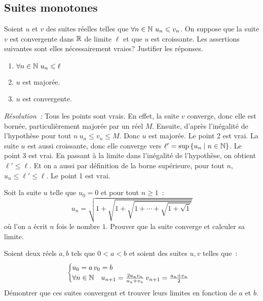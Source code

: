 \subsection{Suites monotones}
\begin{exercice}
    Soient \(u\) et \(v\) des suites réelles telles que \(\forall n 
    \in \mathbb{N} \ u_n \leqslant v_n\). On suppose que la suite \(v\) est 
    convergente dans \(\mathbb{R}\) de limite \(\ell\) et que \(u\) est 
    croissante. Les assertions suivantes sont elles nécessairement 
    vraies? Justifier les réponses.
    \begin{enumerate}
        \item \(\forall n \in \mathbb{N} \ u_n \leqslant \ell\)
        \item \(u\) est majorée.
        \item \(u\) est convergente.
    \end{enumerate}
\end{exercice}
\emph{Résolution~:} Tous les points sont vrais. En effet, la suite 
\(v\) converge, donc elle est bornée, particulièrement majorée par 
un réel \(M\). Ensuite, d'après l'inégalité de l'hypothèse pour 
tout \(n \ u_n \leqslant v_n \leqslant M\). Donc \(u\) est 
majorée. Le point 2 est vrai. La suite \(u\) est aussi croissante, 
donc elle converge vers \(\ell' = \sup\left\{u_n\mathrel{}\middle|\mathrel{}n\in \mathbb{N}\right\}\). Le 
point 3 est vrai. En passant à la limite dans l'inégalité de 
l'hypothèse, on obtient \(\ell' \leqslant \ell\). Et on a aussi 
par définition de la borne supérieure, pour tout \(n\), \(u_n 
\leqslant \ell' \leqslant \ell\). Le point 1 est vrai.
\begin{exercice}
    Soit la suite \(u\) telle que \(u_0 = 0\) et pour tout \(n 
    \geqslant 1\)~:
    \[u_n = \sqrt{1 + \sqrt{1 + \sqrt{1 + \cdots +\sqrt{1 + \sqrt{1}}}}}\]
    où l'on a écrit \(n\) fois le nombre \(1\). Prouver que la suite 
    converge et calculer sa limite.
\end{exercice}
\begin{exercice}
    Soient deux réels \(a, b\) tels que \(0 < a < b\) et soient des 
    suites \(u, v\) telles que~:
    \[ \begin{cases} u_0 = a \, v_0 = b \\ \forall n \in \mathbb{N} \quad 
        u_{n+1} = \frac{2 u_n v_n}{u_n + v_n} \, v_{n+1} = 
    \frac{u_n+v_n}{2} \end{cases}\]
    Démontrer que ces suites convergent et trouver leurs limites en 
    fonction de \(a\) et \(b\).
\end{exercice}

